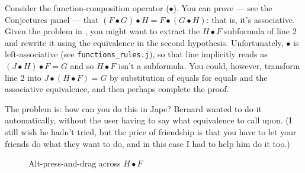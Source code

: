 Consider the function-composition operator ($\bullet$). You can prove --- see the Conjectures panel --- that $(F\bullet G)\bullet H = F\bullet(G\bullet H)$: that is, it's associative. Given the problem in , you might want to extract the $H \bullet F$ subformula of line 2 and rewrite it using the equivalence in the second hypothesis. Unfortunately, $\bullet$ is left-associative (see \texttt{functions\_rules.j}), so that line implicitly reads as $(J\bullet H)\bullet F = G$ and so $H \bullet F$ isn't a subformula. You could, however, transform line 2 into $J\bullet (H \bullet F) = G$ by substitution of equals for equals and the associative equivalence, and then perhaps complete the proof.

The problem is: how can you do this in Jape? Bernard wanted to do it automatically, without the user having to say what equivalence to call upon. (I still wish he hadn't tried, but the price of friendship is that you have to let your friends do what they want to do, and in this case I had to help him do it too.)

\begin{figure}[htbp]
\centering
{}
\qquad
{}
\caption{Alt-press-and-drag across $H \bullet F$}
\label{fig:funcprog:textselectionillustrated}
\end{figure}

